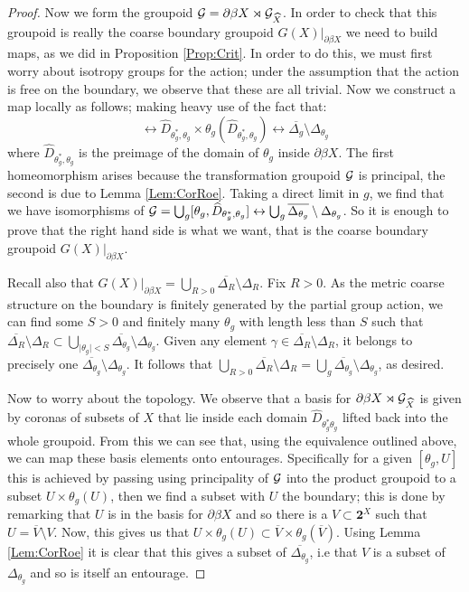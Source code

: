 \begin{proof}
Now we form the groupoid $\mathcal{G} = \partial\beta X \rtimes \mathcal{G}_{\widehat{X}}$. In order to check that this groupoid is really the coarse boundary groupoid $G(X)|_{\partial \beta X}$ we need to build maps, as we did in Proposition \ref{Prop:Crit}. In order to do this, we must first worry about isotropy groups for the action; under the assumption that the action is free on the boundary, we observe that these are all trivial. Now we construct a map locally as follows; making heavy use of the fact that:
\begin{equation*}
[\theta_{g},\widehat{D}_{\theta_{g}^{*},\theta_{g}}] \leftrightarrow \widehat{D}_{\theta_{g}^{*},\theta_{g}}\times \theta_{g}(\widehat{D}_{\theta_{g}^{*},\theta_{g}}) \leftrightarrow \overline{\Delta_{g}}\setminus\Delta_{\theta_{g}}
\end{equation*}
where $\widehat{D}_{\theta_{g}^{*},\theta_{g}}$ is the preimage of the domain of $\theta_{g}$ inside $\partial\beta X$. The first homeomorphism arises because the transformation groupoid $\mathcal{G}$ is principal, the second is due to Lemma \ref{Lem:CorRoe}. Taking a direct limit in $g$, we find that we have isomorphisms of $\mathcal{G} = \bigcup_{g}[\theta_{g},\widehat{D}_{\theta_{g}^{*},\theta_{g}}] \leftrightarrow \bigcup_{g} \overline{\Delta_{\theta_{g}}}\setminus \Delta_{\theta_{g}}$. So it is enough to prove that the right hand side is what we want, that is the coarse boundary groupoid $G(X)|_{\partial\beta X}$.
 
Recall also that $G(X)|_{\partial\beta X} = \bigcup_{R>0} \overline{\Delta_{R}}\setminus\Delta_{R}$. Fix $R>0$. As the metric coarse structure on the boundary is finitely generated by the partial group action, we can find some $S>0$ and finitely many $\theta_{g}$ with length less than $S$ such that $\overline{\Delta_{R}}\setminus\Delta_{R} \subset \bigcup_{\vert \theta_{g} \vert < S} \overline{\Delta_{\theta_{g}}}\setminus \Delta_{\theta_{g}}$. Given any element $\gamma \in \overline{\Delta_{R}}\setminus\Delta_{R}$, it belongs to precisely one $\overline{\Delta_{\theta_{g}}}\setminus \Delta_{\theta_{g}}$. It follows that $\bigcup_{R>0}\overline{\Delta_{R}}\setminus\Delta_{R} = \bigcup_{g}\overline{\Delta_{\theta_{g}}}\setminus \Delta_{\theta_{g}}$, as desired.

Now to worry about the topology. We observe that a basis for $\partial\beta X\rtimes \mathcal{G}_{\widehat{X}}$ is given by coronas of subsets of $X$ that lie inside each domain $\widehat{D}_{\theta_{g}^{*}\theta_{g}}$ lifted back into the whole groupoid. From this we can see that, using the equivalence outlined above, we can map these basis elements onto entourages. Specifically for a given $[\theta_{g},U]$ this is achieved by passing using principality of $\mathcal{G}$ into the product groupoid to a subset $U \times \theta_{g}(U)$, then we find a subset with $U$ the boundary; this is done by remarking that $U$ is in the basis for $\partial\beta X$ and so there is a $V \subset \textbf{2}^{X}$ such that $U = \overline{V}\setminus V$. Now, this gives us that $U \times \theta_{g}(U) \subset \overline{V}\times \theta_{g}(\overline{V})$. Using Lemma \ref{Lem:CorRoe} it is clear that this gives a subset of $\overline{\Delta_{\theta_{g}}}$, i.e that $V$ is a subset of $\Delta_{\theta_{g}}$ and so is itself an entourage.


\end{proof}
